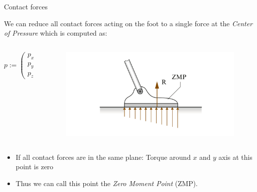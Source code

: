 \begin{frame}{Contact forces}

We can reduce all contact forces acting on the foot to a single force at
the \emph{Center of Pressure} which is computed as:

\begin{columns}
\begin{column}{0.5\textwidth}
\begin{equation*} \label{eq:zmp-definition}
p := \left(\begin{array}{c}
p_x \\ p_y \\ p_z
\end{array}\right)
   = \frac{\sum^N_{i=1}p_i f_{iz}}{\sum^N_{i=1} f_{iz}}
\end{equation*}
\end{column}

\begin{column}{0.5\textwidth}
\begin{figure}[b]
\includegraphics[width=\textwidth,resolution=300]{images/contact_forces.png}
\end{figure}
\end{column}
\end{columns}

\begin{itemize}
\itemsep1pt\parskip0pt
\item
  If all contact forces are in the same plane: Torque around \(x\) and
  \(y\) axis at this point is zero
\item
  Thus we can call this point the \emph{Zero Moment Point} (ZMP).
\end{itemize}

\end{frame}

